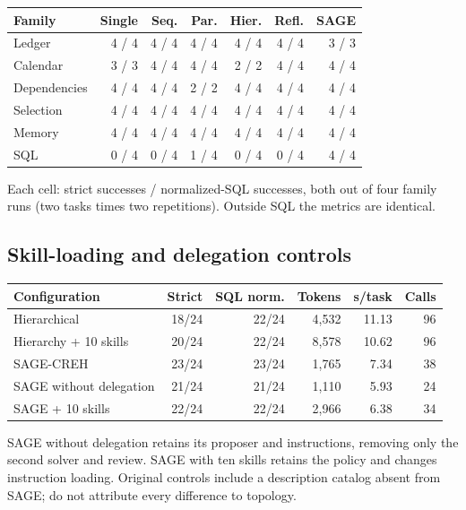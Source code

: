 \begin{center}\small\begin{tabularx}{\linewidth}{@{}Xrrrrrr@{}}\toprule
Family & Single & Seq. & Par. & Hier. & Refl. & SAGE \\ \midrule
Ledger & 4 / 4 & 4 / 4 & 4 / 4 & 4 / 4 & 4 / 4 & 3 / 3 \\
Calendar & 3 / 3 & 4 / 4 & 4 / 4 & 2 / 2 & 4 / 4 & 4 / 4 \\
Dependencies & 4 / 4 & 4 / 4 & 2 / 2 & 4 / 4 & 4 / 4 & 4 / 4 \\
Selection & 4 / 4 & 4 / 4 & 4 / 4 & 4 / 4 & 4 / 4 & 4 / 4 \\
Memory & 4 / 4 & 4 / 4 & 4 / 4 & 4 / 4 & 4 / 4 & 4 / 4 \\
SQL & 0 / 4 & 0 / 4 & 1 / 4 & 0 / 4 & 0 / 4 & 4 / 4 \\
\bottomrule\end{tabularx}\end{center}

Each cell: strict successes / normalized-SQL successes, both out of four family runs (two tasks times two repetitions). Outside SQL the metrics are identical.

\subsection{Skill-loading and delegation controls}

\begin{center}\small
\setlength{\tabcolsep}{4pt}
\begin{tabularx}{\linewidth}{@{}Xrrrrr@{}}
\toprule Configuration & Strict & SQL norm. & Tokens & s/task & Calls \\ \midrule
Hierarchical & 18/24 & 22/24 & 4,532 & 11.13 & 96 \\
Hierarchy + 10 skills & 20/24 & 22/24 & 8,578 & 10.62 & 96 \\
SAGE-CREH & 23/24 & 23/24 & 1,765 & 7.34 & 38 \\
SAGE without delegation & 21/24 & 21/24 & 1,110 & 5.93 & 24 \\
SAGE + 10 skills & 22/24 & 22/24 & 2,966 & 6.38 & 34 \\
\bottomrule
\end{tabularx}\end{center}


SAGE without delegation retains its proposer and instructions, removing only the second solver and review. SAGE with ten skills retains the policy and changes instruction loading. Original controls include a description catalog absent from SAGE; do not attribute every difference to topology.

